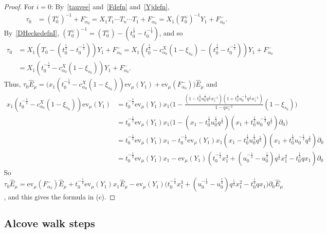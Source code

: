 \documentclass[11pt]{article}
\theoremstyle{plain}
\theoremstyle{definition}
\theoremstyle{remark}
\numberwithin{equation}{section}
\def\ev{\mathrm{ev}}
\newcounter{r}
\newcounter{s}
\begin{document}
\begin{proof}
\smallskip\noindent
For $i=0$: By~\eqref{tauvee} and~\eqref{Fdefn} and~\eqref{Yjdefn}, 
\begin{align*}
\tau_0 
&= (T_0^{\vee})^{-1}+F^-_{\alpha_0} 
=  X_1T_1\cdots T_n\cdots T_1 +F^-_{\alpha_0} 
= X_1 (T_0^{\vee})^{-1}Y_1 +F^-_{\alpha_0}.
\end{align*}
By~\eqref{DHeckedefnI}, $(T_0^{\vee})^{-1} = (T_0^{\vee}) - (t_0^{\frac12}-t_0^{-\frac12})$, and so
\begin{align*}
\tau_0 
&= X_1  (T_0-(t_0^{\frac12}-t_0^{-\frac12})) Y_1 + F^-_{\alpha_0}  
= X_1 (t_0^{\frac12}-c_{\alpha_0}^X(1-\xi_{s_0}) -(t_0^{\frac12}-t_0^{-\frac12})) Y_1 + F^-_{\alpha_0}  \\
&= X_1 (t_0^{-\frac12}-c_{\alpha_0}^X(1-\xi_{s_0})) Y_1 + F^-_{\alpha_0}.
\end{align*}
Thus,
$\tau_0\widehat{E}_\mu
= \Big(x_1 (t_0^{-\frac12}-c_{\alpha_0}^X(1-\xi_{s_0})) \ev_\mu(Y_1) + \ev_\mu(F^-_{\alpha_0})\Big) \widehat{E}_\mu$
and
\begin{align*}
x_1(t_0^{-\frac12}-c_{\alpha_0}^X(1-\xi_{s_0})) \ev_\mu(Y_1) 
&= t_0^{-\frac12} \ev_\mu(Y_1) x_1 \Big( 1 -
\frac{(1-t_0^{\frac12}u_0^{\frac12}q^{\frac12}x_1^{-1})
(1+t_0^{\frac12}u_0^{-\frac12}q^{\frac12}x_1^{-1})}
{1-qx_1^{-2}}
(1-\xi_{s_0})\Big)  \\[1ex]
&= t_0^{-\frac12} \ev_\mu(Y_1) x_1 \Big( 1 -
(x_{1}-t_0^{\frac12}u_0^{\frac12}q^{\frac12})
(x_{1}+t_0^{\frac12}u_0^{-\frac12}q^{\frac12})\partial_{0}\Big)   \\
&= t_0^{-\frac12} \ev_\mu(Y_1) x_1 -
t_0^{-\frac12} \ev_\mu(Y_1) x_1 (x_{1}-t_0^{\frac12}u_0^{\frac12}q^{\frac12})
(x_{1}+t_0^{\frac12}u_0^{-\frac12}q^{\frac12}) \partial_{0}  \\
&= t_0^{-\frac12} \ev_\mu(Y_1) x_1 -
\ev_\mu(Y_1)
(t_0^{-\frac12} x_{1}^{3} + 
(u_0^{-\frac12} - u_0^{\frac12}) q^{\frac12}x_{1}^{2} - t_0^{\frac12} q x_1) \partial_{0} 
\end{align*}
So $\tau_0\widehat{E}_\mu = \ev_\mu(F^-_{\alpha_0})\widehat{E}_\mu  + t_0^{-\frac12} \ev_\mu(Y_1) x_1 \widehat{E}_\mu -
\ev_\mu(Y_1)
\big(t_0^{-\frac12} x_{1}^{3} + 
(u_0^{-\frac12} - u_0^{\frac12}) q^{\frac12}x_{1}^{2} - t_0^{\frac12} q x_1\big) \partial_{0}\widehat{E}_\mu$, and this gives the formula in (c).
\end{proof}




\subsection{Alcove walk steps}\label{alcove walk steps}
\end{document}
